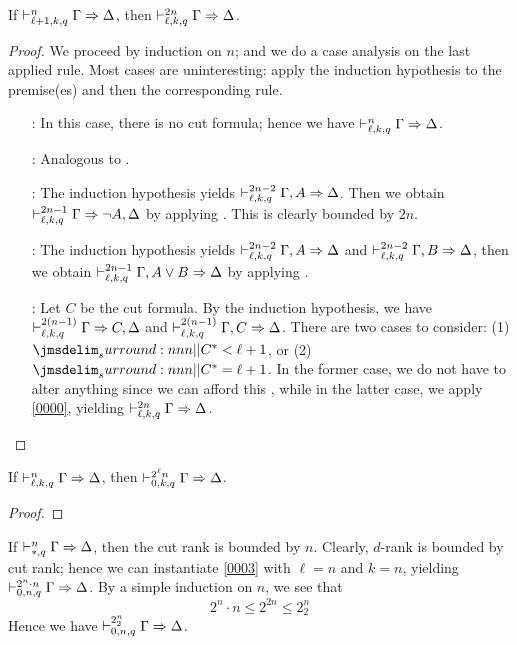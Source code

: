 \documentclass[a4paper]{article}
\begin{document}
\begin{lemma}\label{0002}
  If $\mathrel{\vdash^{n}_{\ell + 1,k,q}} \Gamma \Rightarrow \Delta$, then $\mathrel{\vdash^{2n}_{\ell,k,q}} \Gamma \Rightarrow \Delta$.
\end{lemma}
\begin{proof}
  We proceed by induction on $n$; and we do a case analysis on the last applied rule.
  Most cases are uninteresting: apply the induction hypothesis to the premise(es) and then the corresponding rule.
  \begin{itemize}
  \item[\rId:] In this case, there is no cut formula; hence we have $\mathrel{\vdash^{n}_{\ell,k,q}} \Gamma \Rightarrow \Delta$.
  \item[\rLBot:] Analogous to \rId.
  \item[\rRNot:] The induction hypothesis yields $\mathrel{\vdash^{2n - 2}_{\ell,k,q}} \Gamma, A \Rightarrow \Delta$.
    Then we obtain $\mathrel{\vdash^{2n - 1}_{\ell,k,q}} \Gamma \Rightarrow \lnot A, \Delta$ by applying \rRNot.
    This is clearly bounded by $2n$.
  \item[\rLDis:] The induction hypothesis yields $\mathrel{\vdash^{2n - 2}_{\ell,k,q}} \Gamma, A \Rightarrow \Delta$ and $\mathrel{\vdash^{2n - 2}_{\ell,k,q}} \Gamma, B \Rightarrow \Delta$, then we obtain $\mathrel{\vdash^{2n - 1}_{\ell,k,q}} \Gamma, A \vee B \Rightarrow \Delta$ by applying \rLDis.
  \item[\rCut:] Let $C$ be the cut formula.
    By the induction hypothesis, we have $\mathrel{\vdash^{2(n-1)}_{\ell,k,q}} \Gamma \Rightarrow C,\Delta$ and $\mathrel{\vdash^{2(n-1)}_{\ell,k,q}} \Gamma,C \Rightarrow \Delta$.
    There are two cases to consider: (1) $\dRank{C} < \ell + 1$, or (2) $\dRank{C} = \ell + 1$.
    In the former case, we do not have to alter anything since we can afford this \rCut, while in the latter case, we apply \cref{0000}, yielding $\mathrel{\vdash^{2n}_{\ell,k,q}} \Gamma \Rightarrow \Delta$.
  \end{itemize}
\end{proof}

\begin{lemma}\label{0003}
  If $\mathrel{\vdash^{n}_{\ell,k,q}} \Gamma \Rightarrow \Delta$, then $\mathrel{\vdash^{2^{\ell}n}_{0,k,q}} \Gamma \Rightarrow \Delta$.
\end{lemma}
\begin{proof}
\end{proof}

\begin{remark}
  If $\mathrel{\vdash^{n}_{\mathord{*},q}} \Gamma \Rightarrow \Delta$, then the cut rank is bounded by $n$.
  Clearly, $d$-rank is bounded by cut rank; hence we can instantiate \cref{0003} with $\ell = n$ and $k = n$, yielding $\mathrel{\vdash^{2^n \cdot n}_{0,n,q}} \Gamma \Rightarrow \Delta$.
  By a simple induction on $n$, we see that
  \[
    2^n \cdot n \leq 2^{2n} \leq 2^n_2
  \]
  Hence we have $\mathrel{\vdash^{2^n_2}_{0,n,q}} \Gamma \Rightarrow \Delta$.
\end{remark}
\end{document}
